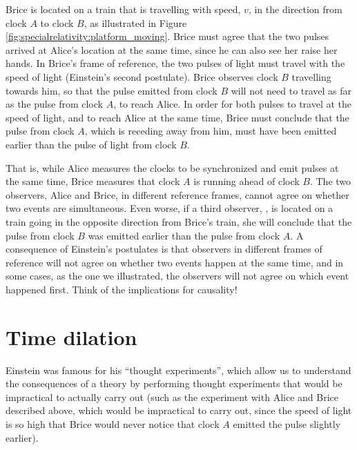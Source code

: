 Brice is located on a train that is travelling with speed, $v$, in the direction from clock $A$ to clock $B$, as illustrated in Figure \ref{fig:specialrelativity:platform_moving}.
Brice must agree that the two pulses arrived at Alice's location at the same time, since he can also see her raise her hands. In Brice's frame of reference, the two pulses of light must travel with the speed of light (Einstein's second postulate). Brice observes clock $B$ travelling towards him, so that the pulse emitted from clock $B$ will not need to travel as far as the pulse from clock $A$, to reach Alice. In order for both pulses to travel at the speed of light, and to reach Alice at the same time, Brice must conclude that the pulse from clock $A$, which is receding away from him, must have been emitted earlier than the pulse of light from clock $B$.

That is, while Alice measures the clocks to be synchronized and emit pulses at the same time, Brice measures that clock $A$ is running ahead of clock $B$. The two observers, Alice and Brice, in different reference frames, cannot agree on whether two events are simultaneous. Even worse, if a third observer, \chloens, is located on a train going in the opposite direction from Brice's train, she will conclude that the pulse from clock $B$ was emitted earlier than the pulse from clock $A$. A consequence of Einstein's postulates is that observers in different frames of reference will not agree on whether two events happen at the same time, and in some cases, as the one we illustrated, the observers will not agree on which event happened first. Think of the implications for causality!

\section{Time dilation}
Einstein was famous for his ``thought experiments'', which allow us to understand the consequences of a theory by performing thought experiments that would be impractical to actually carry out (such as the experiment with Alice and Brice described above, which would be impractical to carry out, since the speed of light is so high that Brice would never notice that clock $A$ emitted the pulse slightly earlier). 

